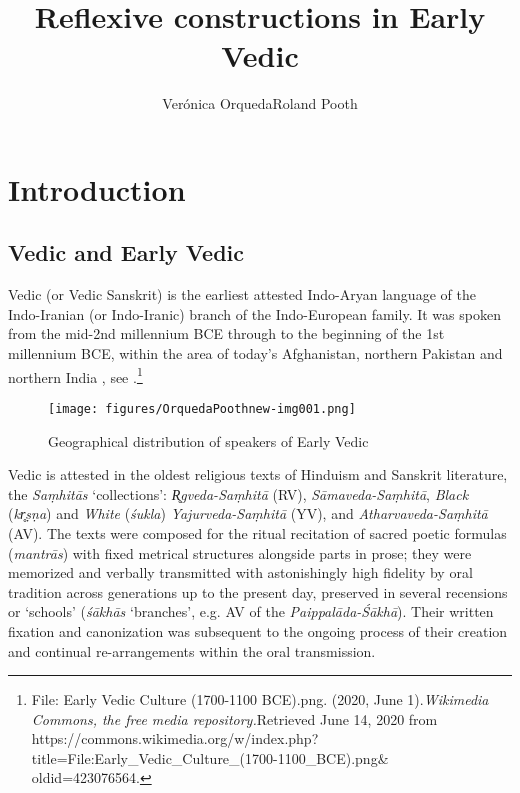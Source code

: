 \documentclass[output=paper]{langscibook}
\author{Verónica Orqueda\affiliation{Pontificia Universidad Católica de Chile}\orcid{}\lastand Roland Pooth\affiliation{Köln-Nippes}\orcid{}}
\title{Reflexive constructions in Early Vedic}
\begin{document}
\maketitle


\section{Introduction} %
\label{sec:Orqueda:1}

\subsection{Vedic and Early Vedic}
\label{sec:Orqueda:1.1}


{Vedic (or Vedic Sanskrit) is the earliest attested Indo-Aryan language of the Indo-Iranian (or Indo-Iranic) branch of the Indo-European family. It was spoken from the mid-2nd millennium BCE through to the beginning of the 1st millennium BCE, within the area of today’s Afghanistan, northern Pakistan and northern India \citep[160]{Witzel2006}, see .}\footnote{{{File: Early Vedic Culture (1700-1100 BCE).png. (2020, June 1).}{\textit{Wikimedia Commons, the free media repository.}}{Retrieved June 14, 2020 from https://commons.wikimedia.org/w/index.php?title=File:Early\_Vedic\_Culture\_(1700-1100\_BCE).png\& oldid=423076564.}}}

\begin{figure}
\texttt{[image: figures/OrquedaPoothnew-img001.png]}
\caption{Geographical distribution of speakers of Early Vedic}
\label{fig:Orqueda:1}
\end{figure}

{Vedic is attested in the oldest religious texts of Hinduism and Sanskrit literature, the \textit{Saṃhitās} ‘collections’: \textit{R̥gveda-Saṃhitā} (RV), \textit{Sāmaveda-Saṃhitā}, \textit{Black} (\textit{kr̥ṣṇa}) and \textit{White} (\textit{śukla}) \textit{Yajurveda-Saṃhitā} (YV), and \textit{Atharvaveda-Saṃhitā} (AV). The texts were composed for the ritual recitation of sacred poetic formulas (\textit{mantrās}) with fixed metrical structures alongside parts in prose; they were memorized and verbally transmitted with astonishingly high fidelity by oral tradition across generations up to the present day, preserved in several recensions or ‘schools’ (\textit{śākhās} ‘branches’, e.g. AV of the \textit{Paippalāda-Śākhā}). Their written fixation and canonization was subsequent to the ongoing process of their creation and continual re-arrangements within the oral transmission.}
\end{document}
